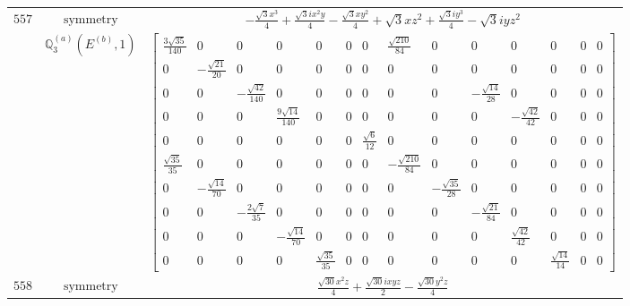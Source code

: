 \documentclass[fleqn,8pt,landscape]{jsarticle}
\begin{document}
\begin{longtable}{ccc}
$ 557 $ & $ \text{symmetry} $ & $ - \frac{\sqrt{3} x^{3}}{4} + \frac{\sqrt{3} i x^{2} y}{4} - \frac{\sqrt{3} x y^{2}}{4} + \sqrt{3} x z^{2} + \frac{\sqrt{3} i y^{3}}{4} - \sqrt{3} i y z^{2} $ \\
$  $ & $ \mathbb{Q}_{3}^{(a)}(E^{(b)},1) $ & $ \begin{bmatrix} \frac{3 \sqrt{35}}{140} & 0 & 0 & 0 & 0 & 0 & 0 & \frac{\sqrt{210}}{84} & 0 & 0 & 0 & 0 & 0 & 0 \\ 0 & - \frac{\sqrt{21}}{20} & 0 & 0 & 0 & 0 & 0 & 0 & 0 & 0 & 0 & 0 & 0 & 0 \\ 0 & 0 & - \frac{\sqrt{42}}{140} & 0 & 0 & 0 & 0 & 0 & 0 & - \frac{\sqrt{14}}{28} & 0 & 0 & 0 & 0 \\ 0 & 0 & 0 & \frac{9 \sqrt{14}}{140} & 0 & 0 & 0 & 0 & 0 & 0 & - \frac{\sqrt{42}}{42} & 0 & 0 & 0 \\ 0 & 0 & 0 & 0 & 0 & 0 & \frac{\sqrt{6}}{12} & 0 & 0 & 0 & 0 & 0 & 0 & 0 \\ \frac{\sqrt{35}}{35} & 0 & 0 & 0 & 0 & 0 & 0 & - \frac{\sqrt{210}}{84} & 0 & 0 & 0 & 0 & 0 & 0 \\ 0 & - \frac{\sqrt{14}}{70} & 0 & 0 & 0 & 0 & 0 & 0 & - \frac{\sqrt{35}}{28} & 0 & 0 & 0 & 0 & 0 \\ 0 & 0 & - \frac{2 \sqrt{7}}{35} & 0 & 0 & 0 & 0 & 0 & 0 & - \frac{\sqrt{21}}{84} & 0 & 0 & 0 & 0 \\ 0 & 0 & 0 & - \frac{\sqrt{14}}{70} & 0 & 0 & 0 & 0 & 0 & 0 & \frac{\sqrt{42}}{42} & 0 & 0 & 0 \\ 0 & 0 & 0 & 0 & \frac{\sqrt{35}}{35} & 0 & 0 & 0 & 0 & 0 & 0 & \frac{\sqrt{14}}{14} & 0 & 0 \end{bmatrix} $ \\ \hline
$ 558 $ & $ \text{symmetry} $ & $ \frac{\sqrt{30} x^{2} z}{4} + \frac{\sqrt{30} i x y z}{2} - \frac{\sqrt{30} y^{2} z}{4} $ \\

\end{longtable}
\end{document}
